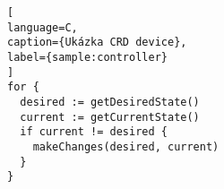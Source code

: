 \begin{lstfloat}
\begin{lstlisting}[
language=C,
caption={Ukázka CRD device},
label={sample:controller}
]
for {
  desired := getDesiredState()
  current := getCurrentState()
  if current != desired {
    makeChanges(desired, current)
  }
}
\end{lstlisting}
\end{lstfloat}